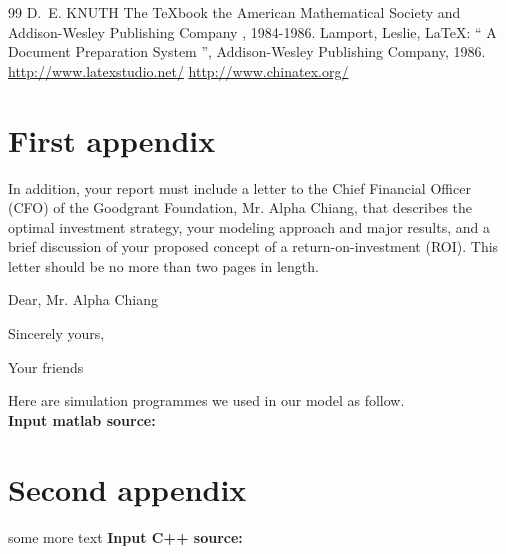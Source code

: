 \documentclass{mcmthesis}
\begin{document}
\begin{thebibliography}{99}
 D.~E. KNUTH   The \TeX{}book  the American
Mathematical Society and Addison-Wesley
Publishing Company , 1984-1986.
Lamport, Leslie,  \LaTeX{}: `` A Document Preparation System '',
Addison-Wesley Publishing Company, 1986.
\url{http://www.latexstudio.net/}
\url{http://www.chinatex.org/}
\end{thebibliography}

\begin{appendices}

\section{First appendix}

In addition, your report must include a letter to the Chief Financial Officer (CFO) of the Goodgrant Foundation, Mr. Alpha Chiang, that describes the optimal investment strategy, your modeling approach and major results, and a brief discussion of your proposed concept of a return-on-investment (ROI). This letter should be no more than two pages in length.

\begin{letter}{Dear, Mr. Alpha Chiang}

\lipsum[1-2]

\vspace{\parskip}

Sincerely yours,

Your friends

\end{letter}
Here are simulation programmes we used in our model as follow.\\

\textbf{\textcolor[rgb]{0.98,0.00,0.00}{Input matlab source:}}


\section{Second appendix}

some more text \textcolor[rgb]{0.98,0.00,0.00}{\textbf{Input C++ source:}}


\end{appendices}
\end{document}
